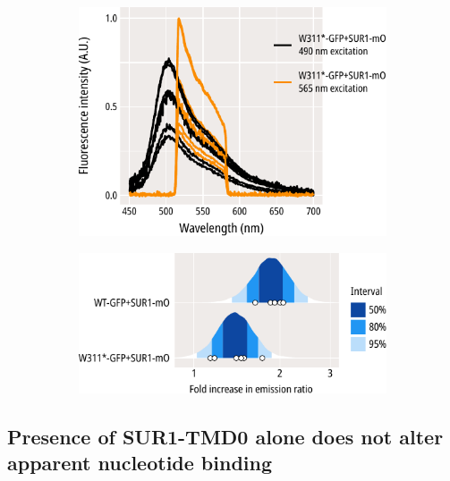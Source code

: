 \begin{figure}[h]
\begin{subfigure}[t]{0.3\textwidth}
		\includegraphics[width=\textwidth]{w311_gfp_mo_spectra_2.pdf}
	\end{subfigure}
	\hfill
	\begin{subfigure}[t]{0.3\textwidth}
		\caption{}\label{ch6fig:gfp_ofp_contrasts_1}
		\centering
		\includegraphics[width=\textwidth]{gfp_ofp_contrasts_1.pdf}
	\end{subfigure}
	\caption[SUR1 associates with WT-GFP and W311*-GFP]{
	}\label{ch6fig:sur_assays}
\end{figure}

\subsection{Presence of SUR1-TMD0 alone does not alter apparent nucleotide binding}

